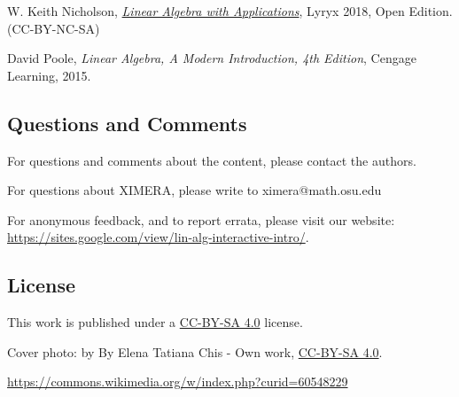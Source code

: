\documentclass{ximera}
\begin{document}
W. Keith Nicholson, \href{https://open.umn.edu/opentextbooks/textbooks/linear-algebra-with-applications}{\it Linear Algebra with Applications}, Lyryx 2018, Open Edition. (CC-BY-NC-SA)

David Poole, {\it Linear Algebra, A Modern Introduction, 4th Edition}, Cengage Learning, 2015.  


\subsection*{Questions and Comments}
For questions and comments about the content, please contact the authors.

For questions about XIMERA, please write to ximera@math.osu.edu

For anonymous feedback, and to report errata, please visit our website: \href{https://sites.google.com/view/lin-alg-interactive-intro/}{https://sites.google.com/view/lin-alg-interactive-intro/}.

\subsection*{License}
This work is published under a \href{https://creativecommons.org/licenses/by-sa/4.0/deed.en}{CC-BY-SA 4.0} license.

Cover photo:   by By Elena Tatiana Chis - Own work, \href{https://creativecommons.org/licenses/by-sa/4.0/deed.en}{CC-BY-SA 4.0}.  

\href{https://commons.wikimedia.org/w/index.php?curid=60548229}{https://commons.wikimedia.org/w/index.php?curid=60548229}
\end{document}
